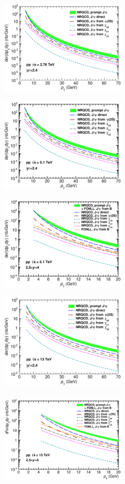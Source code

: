 \documentclass{iopart}
\begin{document}
\begin{figure}[t]
 \begin{center}
 \includegraphics[width=6.15cm,height=5.0cm,angle=0]{Mid_Prompt_JPsi_2760GeV_24-24.eps}~~~~ \includegraphics[width=6.15cm,height=5.0cm,angle=0]{Mid_Prompt_JPsi_5100GeV_0-24.eps}~~~~~\\ \includegraphics[width=6.15cm,height=5.0cm,angle=0]{Inclusive_JPSI_ALICE_5100GeV.eps}~~~~ \includegraphics[width=6.15cm,height=5.0cm,angle=0]{Mid_Prompt_JPsi_13TeV_0-24.eps}~~~~~\\ \includegraphics[width=6.15cm,height=5.0cm,angle=0]{13TeV_Inclusive_Jpsi_ALICE_all.eps} 

\end{center}
\end{figure}
\end{document}

